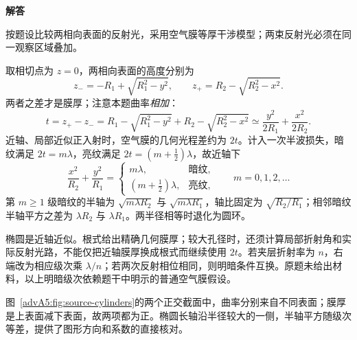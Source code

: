 \begin{advsolution}
\begin{minipage}{\linewidth}{\bfseries\color{DeepBlue}解答}
\begin{center}
\begin{minipage}{\linewidth}
\end{minipage}\end{center}\end{minipage}

按题设比较两相向表面的反射光，采用空气膜等厚干涉模型；两束反射光必须在同一观察区域叠加。

取相切点为 $z=0$，两相向表面的高度分别为
\[
 z_-=-R_1+\sqrt{R_1^2-y^2},\qquad z_+=R_2-\sqrt{R_2^2-x^2}.
\]
两者之差才是膜厚；注意本题曲率\emph{相加}：
\[
 t=z_+-z_-=R_1-\sqrt{R_1^2-y^2}+R_2-\sqrt{R_2^2-x^2}
 \simeq\frac{y^2}{2R_1}+\frac{x^2}{2R_2}.
\]
近轴、局部近似正入射时，空气膜的几何光程差约为 $2t$。计入一次半波损失，暗纹满足 $2t=m\lambda$，亮纹满足 $2t=(m+\tfrac12)\lambda$，故近轴下
\[
 \boxed{\frac{x^2}{R_2}+\frac{y^2}{R_1}=
 \begin{cases}m\lambda,&\text{暗纹},\\(m+\tfrac12)\lambda,&\text{亮纹},\end{cases}
 \qquad m=0,1,2,\ldots}
\]
第 $m\ge1$ 级暗纹的半轴为 $\sqrt{m\lambda R_2}$ 与 $\sqrt{m\lambda R_1}$，轴比固定为 $\sqrt{R_2/R_1}$；相邻暗纹半轴平方之差为 $\lambda R_2$ 与 $\lambda R_1$。两半径相等时退化为圆环。

椭圆是近轴近似。根式给出精确几何膜厚；较大孔径时，还须计算局部折射角和实际反射光路，不能仅把近轴膜厚换成根式而继续使用 $2t$。若夹层折射率为 $n$，右端改为相应级次乘 $\lambda/n$；若两次反射相位相同，则明暗条件互换。原题未给出材料，以上明暗级次依赖题干中明示的普通空气膜假设。

图~\ref{advA5:fig:source-cylinders}的两个正交截面中，曲率分别来自不同表面；膜厚是上表面减下表面，故两项都为正。椭圆长轴沿半径较大的一侧，半轴平方随级次等差，提供了图形方向和系数的直接核对。
\end{advsolution}
